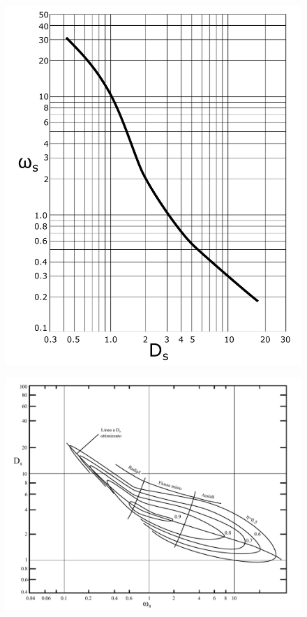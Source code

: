 \begin{figure}
\centering
\begin{minipage}{.5\textwidth}
  \centering
  \includegraphics[width=.95\linewidth]{fig/cord_diag.pdf}
  \label{fig:cord_diag}
\end{minipage}%
\begin{minipage}{.5\textwidth}
  \centering
  \includegraphics[width=\linewidth]{fig/primo_3.pdf}
  \label{fig:primo_3}
\end{minipage}
\end{figure}

